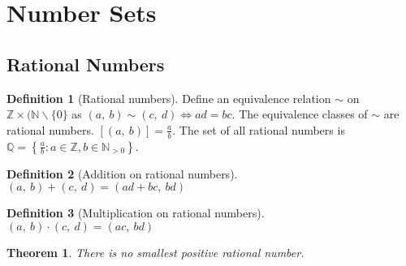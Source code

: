 \documentclass{article}
\newcommand*{\N}{\mathbb{N}}
\newcommand*{\Z}{\mathbb{Z}}
\newcommand*{\Q}{\mathbb{Q}}
\theoremstyle{plain}
\newtheorem{theorem}{Theorem}[section]
\numberwithin{theorem}{subsection}
\theoremstyle{definition}
\newtheorem{definition}{Definition}[section]
\numberwithin{definition}{subsection}
\theoremstyle{remark}
\numberwithin{note}{subsection}
\begin{document}
\section{Number Sets}
\subsection{Rational Numbers}
\begin{definition}[Rational numbers]
    Define an equivalence relation $\sim$ on $\Z \times (\N\backslash\{0\}$
    as $(a,\: b) \sim (c,\: d) \iff ad=bc$.
    The equivalence classes of $\sim$ are rational numbers.
    $[(a,\: b)] = \frac{a}{b}$.
    The set of all rational numbers is
    $\Q = \left\{ \frac{a}{b} : a\in \Z, b\in \N_{>0} \right\}$.
\end{definition}
%
\begin{definition}[Addition on rational numbers]
    $(a,\: b) + (c,\: d) = (ad+bc,\: bd)$
\end{definition}
%
\begin{definition}[Multiplication on rational numbers]
    $(a,\: b) \cdot (c,\: d) = (ac,\: bd)$
\end{definition}
\begin{theorem}
	There is no smallest positive rational number.
\end{theorem}
%
\end{document}
